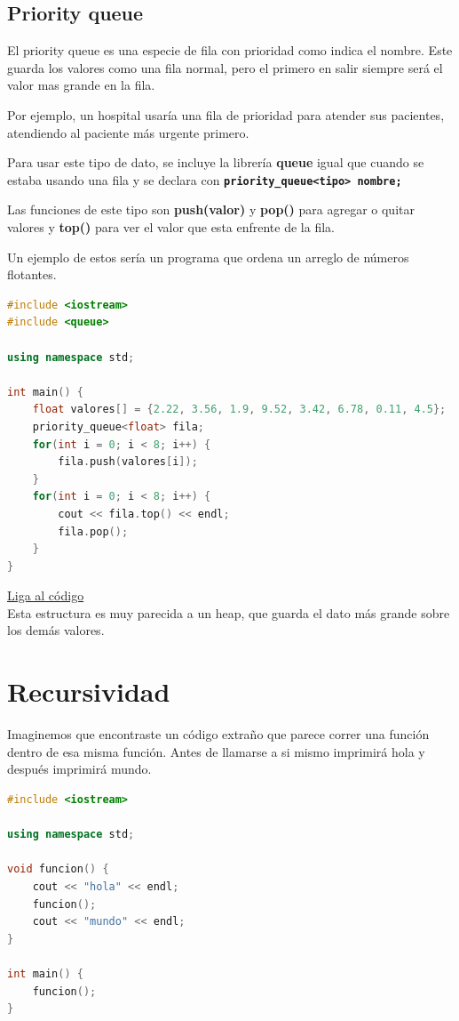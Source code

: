 \documentclass{article}
\begin{document}
\subsection{Priority queue}

El priority queue es una especie de fila con prioridad como indica el nombre. Este guarda los valores como una fila normal, pero el primero en salir siempre será el valor mas grande en la fila.

Por ejemplo, un hospital usaría una fila de prioridad para atender sus pacientes, atendiendo al paciente más urgente primero.

Para usar este tipo de dato, se incluye la librería \textbf{queue} igual que cuando se estaba usando una fila y se declara con \textbf{\lstinline{priority_queue<tipo> nombre;}}

Las funciones de este tipo son \textbf{push(valor)} y \textbf{pop()} para agregar o quitar valores y \textbf{top()} para ver el valor que esta enfrente de la fila.

Un ejemplo de estos sería un programa que ordena un arreglo de números flotantes.

\begin{lstlisting}[language=C++, caption=Filas de prioridad]
#include <iostream>
#include <queue>

using namespace std;

int main() {
    float valores[] = {2.22, 3.56, 1.9, 9.52, 3.42, 6.78, 0.11, 4.5};
    priority_queue<float> fila;
    for(int i = 0; i < 8; i++) {
        fila.push(valores[i]);
    }
    for(int i = 0; i < 8; i++) {
        cout << fila.top() << endl;
        fila.pop();
    }
}
\end{lstlisting}
\href{https://repl.it/@Jamesscn/Prioridades}{Liga al código} \\

Esta estructura es muy parecida a un heap, que guarda el dato más grande sobre los demás valores.

\section{Recursividad}

Imaginemos que encontraste un código extraño que parece correr una función dentro de esa misma función. Antes de llamarse a si mismo imprimirá hola y después imprimirá mundo.

\begin{lstlisting}[language=C++, caption=Funciones]
#include <iostream>

using namespace std;

void funcion() {
    cout << "hola" << endl;
    funcion();
    cout << "mundo" << endl;
}

int main() {
    funcion();
}
\end{lstlisting}
\end{document}

